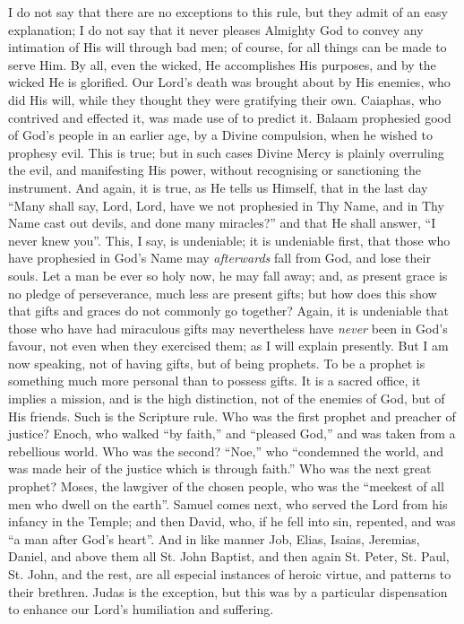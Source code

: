 I do not say that there are no exceptions to this rule, but they
admit of an easy explanation; I do not say that it never pleases
Almighty God to convey any intimation of His will through bad men; of
course, for all things can be made to serve Him. By all, even the
wicked, He accomplishes His purposes, and by the wicked He is
glorified. Our Lord's death was brought about by His enemies, who did
His will, while they thought they were gratifying their own. Caiaphas,
who contrived and effected it, was made use of to predict it. Balaam
prophesied good of God's people in an earlier age, by a Divine
compulsion, when he wished to prophesy evil. This is true; but in such
cases Divine Mercy is plainly overruling the evil, and manifesting His
power, without recognising or sanctioning the instrument. And again,
it is true, as He tells us Himself, that in the last day ``Many
shall say, Lord, Lord, have we not prophesied in Thy Name, and in Thy
Name cast out devils, and done many miracles?'' and that He shall
answer, ``I never knew you''. This, I say, is undeniable; it
is undeniable first, that those who have prophesied in God's Name may \emph{afterwards} fall from God, and lose their souls. Let a man be ever so
holy now, he may fall away; and, as present grace is no pledge of
perseverance, much less are present gifts; but how does this show that
gifts and graces do not commonly go together? Again, it is undeniable
that those who have had miraculous gifts may nevertheless have \emph{never}
been in God's favour, not even when they exercised them; as I will
explain presently. But I am now speaking, not of having gifts, but of
being prophets. To be a prophet is something much more personal than
to possess gifts. It is a sacred office, it implies a mission, and is
the high distinction, not of the enemies of God, but of His friends.
Such is the Scripture rule. Who was the first prophet and preacher of
justice? Enoch, who walked ``by faith,'' and ``pleased
God,'' and was taken from a rebellious world. Who was the second?
``Noe,'' who ``condemned the world, and was made heir of
the justice which is through faith.'' Who was the next great
prophet? Moses, the lawgiver of the chosen people, who was the
``meekest of all men who dwell on the earth''. Samuel comes
next, who served the Lord from his infancy in the Temple; and then
David, who, if he fell into sin, repented, and was ``a man after
God's heart''. And in like manner Job, Elias, Isaias, Jeremias,
Daniel, and above them all St. John Baptist, and then again St. Peter,
St. Paul, St. John, and the rest, are all especial instances of heroic
virtue, and patterns to their brethren. Judas is the exception, but
this was by a particular dispensation to enhance our Lord's
humiliation and suffering.

